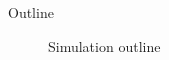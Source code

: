 \documentclass[9pt]{beamer}
\begin{document}
\begin{frame}{Outline}

\begin{figure}[H]
\center
{}
\caption{Simulation outline}
\label{outline}
\end{figure}


\end{frame}
\end{document}
